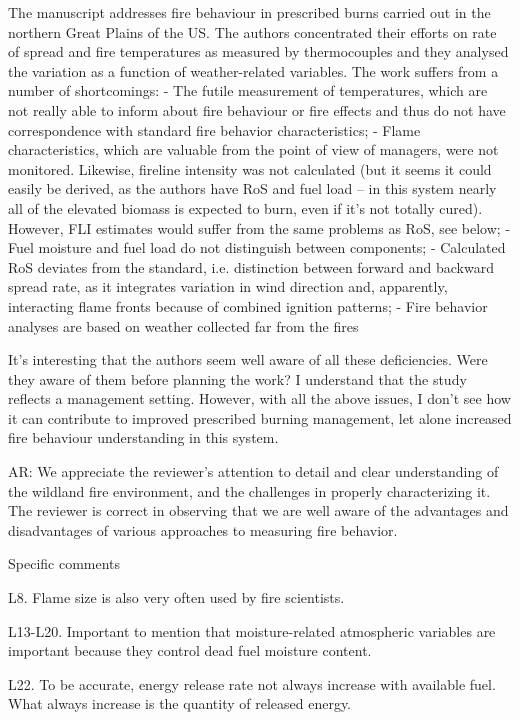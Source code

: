 \documentclass[parskip=half]{scrartcl}
\newcommand{\AR}[1]
	{\color{PineGreen}AR: #1\color{black} \par }
\begin{document}
The manuscript addresses fire behaviour in prescribed burns carried out in the northern Great Plains of the US. The authors concentrated their efforts on rate of spread and fire temperatures as measured by thermocouples and they analysed the variation as a function of weather-related variables. The work suffers from a number of shortcomings:
-	The futile measurement of temperatures, which are not really able to inform about fire behaviour or fire effects and thus do not have  correspondence with standard fire behavior characteristics;
-	Flame characteristics, which are valuable from the point of view of managers, were not monitored. Likewise, fireline intensity was not calculated (but it seems it could easily be derived, as the authors have RoS and fuel load – in this system nearly all of the elevated biomass is expected to burn, even if it’s not totally cured). However, FLI estimates would suffer from the same problems as RoS, see below;
-	Fuel moisture and fuel load do not distinguish between components;
-	Calculated RoS deviates from the standard, i.e. distinction between forward and backward spread rate, as it integrates variation in wind direction and, apparently, interacting flame fronts because of combined ignition patterns;
-	Fire behavior analyses are based on weather collected far from the fires

It’s interesting that the authors seem well aware of all these deficiencies. Were they aware of them before planning the work?  I understand that the study reflects a management setting. However, with all the above issues, I don’t see how it can contribute to improved prescribed burning management, let alone increased fire behaviour understanding in this system. 

\AR{We appreciate the reviewer's attention to detail and clear understanding of the wildland fire environment, and the challenges in properly characterizing it.  
The reviewer is correct in observing that we are well aware of the advantages and disadvantages of various approaches to measuring fire behavior. }

Specific comments

L8. Flame size is also very often used by fire scientists.

L13-L20. Important to mention that moisture-related atmospheric variables are important because they control dead fuel moisture content.

L22. To be accurate, energy release rate not always increase with available fuel. What always increase is the quantity of released energy.
\end{document}
